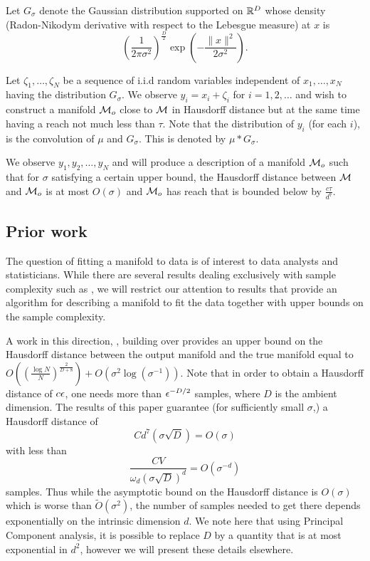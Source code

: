 \documentclass[final, 12pt]{colt2018} %
\begin{document}
 Let $G_\sigma$ denote the Gaussian distribution supported on $\mathbb R^D$ whose density (Radon-Nikodym derivative with respect to the Lebesgue measure) at $x$ is 
$$ \left(\frac{1}{2 \pi \sigma^2}\right)^{\frac{D}{2}}  \exp \left(-\frac{\|x\|^2}{2 \sigma^2} \right).$$ 

Let $\zeta_1, \dots, \zeta_N$ be a sequence of i.i.d random variables independent of $x_1, \dots, x_N$ having the distribution $G_\sigma$.
We observe $y_i = x_i + \zeta_i$ for $i = 1, 2, \dots$ and wish to construct a manifold $\mathcal M_o$ close to  $\mathcal M$  in Hausdorff  distance but at the same time having a reach not much less than $\tau$. Note that the distribution of $y_i$ (for each $i$), is the convolution of $\mu$ and $G_\sigma$.  This is denoted by $\mu*G_\sigma$.

We observe $y_1, y_2, \dots, y_N$ and will  produce a description of a manifold $\mathcal M_o$ such that for $\sigma$ satisfying a certain upper bound, the Hausdorff distance between $\mathcal M$ and $\mathcal M_o$ is at most $ O(\sigma)$ and $\mathcal M_o$ has reach that is bounded below by $\frac{c\tau}{d^7}$.

\subsection{Prior work}

The question of fitting a manifold to data is of interest to data analysts and statisticians. While there are several results dealing exclusively with sample complexity such as \cite{ Wasserman, NarMit}, we will restrict our attention to results that provide an algorithm for describing a manifold to fit the data  together with upper bounds on the sample complexity. 

A  work in this direction, \cite{Wasserman3}, building over \cite{Ozertem11} provides an upper bound on the Hausdorff distance between the output manifold and the true manifold equal to $O((\frac{\log N}{N})^{\frac{2}{D+8}}) + {O}(\sigma^2\log (\sigma^{-1}))$. Note that in order to obtain a Hausdorff distance of $c{\epsilon}$, one needs more than ${\epsilon}^{-D/2}$ samples, where $D$ is the ambient dimension. The  results of this paper  guarantee (for sufficiently small $\sigma$,) a Hausdorff distance of $$Cd^{{7}} (\sigma \sqrt{D}) = O(\sigma)$$ with less than $$\frac{CV}{\omega_d( \sigma \sqrt{D})^{d}} = O(\sigma^{-d})$$ samples.  Thus while the asymptotic bound on the Hausdorff distance is $O(\sigma)$ which is worse than $\tilde{O}(\sigma^2)$, the number of samples needed to get there depends exponentially on the intrinsic dimension $d$. We note here that using Principal Component analysis, it is possible to replace $D$ by a quantity that is at most exponential in $d^2$, however we will present these details elsewhere.
\end{document}
